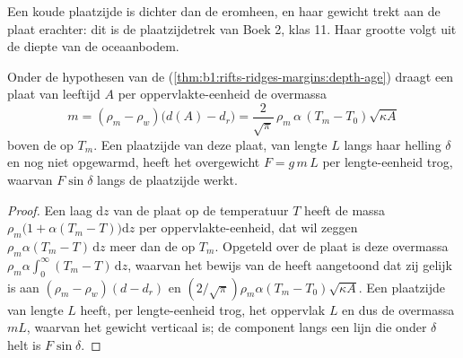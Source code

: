 Een koude plaatzijde is dichter dan de  eromheen, en haar gewicht trekt aan de plaat erachter: dit is de plaatzijdetrek van Boek 2, klas 11. Haar grootte volgt uit de diepte van de oceaanbodem.

\begin{proposition}\label{prop:b1:active-margins:slab-weight}
Onder de hypothesen van de 
(\cref{thm:b1:rifts-ridges-margins:depth-age}) draagt een plaat van leeftijd $A$ per
oppervlakte-eenheid de overmassa
\[
  m = (\rho_m - \rho_w)\bigl(d(A) - d_r\bigr)
    = \frac{2}{\sqrt\pi}\,\rho_m\,\alpha\,(T_m - T_0)\sqrt{\kappa A}
\]
boven de  op $T_m$. Een plaatzijde van deze plaat, van lengte $L$ langs haar helling $\delta$ en nog niet opgewarmd, heeft het overgewicht $F = g\,m\,L$ per lengte-eenheid trog, waarvan $F\sin\delta$ langs de plaatzijde werkt.
\end{proposition}

\begin{proof}
Een laag $\mathrm dz$ van de plaat op de temperatuur $T$ heeft de massa
$\rho_m\bigl(1 + \alpha(T_m - T)\bigr)\mathrm dz$ per oppervlakte-eenheid, dat wil zeggen
$\rho_m\alpha(T_m - T)\,\mathrm dz$ meer dan de  op $T_m$. Opgeteld over de plaat is deze overmassa $\rho_m\alpha\int_0^\infty (T_m - T)\,\mathrm dz$, waarvan het bewijs van de  heeft aangetoond dat zij gelijk is aan
$(\rho_m - \rho_w)(d - d_r)$ en $(2/\sqrt\pi)\rho_m\alpha(T_m - T_0)
\sqrt{\kappa A}$. Een plaatzijde van lengte $L$ heeft, per lengte-eenheid trog, het oppervlak
$L$ en dus de overmassa $mL$, waarvan het gewicht verticaal is; de component langs een
lijn die onder $\delta$ helt is $F\sin\delta$.
\end{proof}

